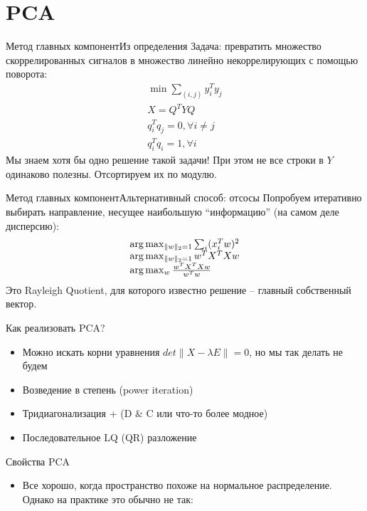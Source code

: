 \documentclass[14pt, fleqn, xcolor={dvipsnames, table}]{beamer}
\begin{document}
\section{PCA}

\begin{frame}{Метод главных компонент}{Из определения}
{\color{blue}Задача:} превратить множество скоррелированных сигналов в множество линейно некоррелирующих с помощью поворота:
$$\begin{array}{l}
\min \sum_{(i,j)} y_i^T y_j \\
X = Q^T Y Q \\
q_i^T q_j = 0, \forall i \ne j \\
q_i^T q_i = 1, \forall i 
\end{array}$$
Мы знаем хотя бы одно решение такой задачи! При этом не все строки в $Y$ одинаково полезны. Отсортируем их по модулю.
\end{frame}

\begin{frame}{Метод главных компонент}{Альтернативный способ: отсосы}
Попробуем итеративно выбирать направление, несущее наибольшую ``информацию'' (на самом деле дисперсию):
$$\begin{array}{l}
\arg \max_{\|w\|_2=1} \sum_i (x_i^Tw)^2 \\
\arg \max_{\|w\|_2=1} w^T X^TXw \\
\arg \max_{w} {w^T X^TXw \over w^Tw} \\
\end{array}$$
Это Rayleigh Quotient, для которого известно решение -- главный собственный вектор.
\end{frame}

\begin{frame}{Как реализовать PCA?}
\begin{itemize}
  \item Можно искать корни уравнения $det\|X - \lambda E\| = 0$, но мы так делать не будем
  \item Возведение в степень (power iteration)
  \item Тридиагонализация + (D \& C или что-то более модное)
  \item Последовательное LQ (QR) разложение
\end{itemize}
\end{frame}

\begin{frame}{Свойства PCA}
\begin{itemize}
  \item Все хорошо, когда пространство похоже на нормальное распределение. Однако на практике это обычно не так:
\end{itemize}
\end{frame}
\end{document}
